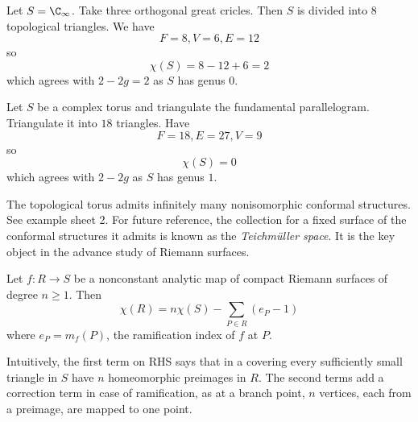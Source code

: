 \documentclass[a4paper]{article}
\begin{document}
\begin{eg}
  Let \(S = \C_\infty\). Take three orthogonal great cricles. Then \(S\) is divided into \(8\) topological triangles. We have
  \[
    F= 8, V = 6, E = 12
  \]
  so
  \[
    \chi(S) = 8 - 12 + 6 = 2
  \]
  which agrees with \(2 - 2g = 2\) as \(S\) has genus \(0\).
\end{eg}

\begin{eg}
  Let \(S\) be a complex torus and triangulate the fundamental parallelogram. Triangulate it into \(18\) triangles. Have
  \[
    F = 18, E = 27, V = 9
  \]
  so
  \[
    \chi(S) = 0
  \]
  which agrees with \(2 - 2g\) as \(S\) has genus \(1\).
\end{eg}

\begin{remark}
  The topological torus admits infinitely many nonisomorphic conformal structures. See example sheet 2. For future reference, the collection for a fixed surface of the conformal structures it admits is known as the \emph{Teichmüller space}. It is the key object in the advance study of Riemann surfaces.
\end{remark}

\begin{theorem}
  Let \(f: R \to S\) be a nonconstant analytic map of compact Riemann surfaces of degree \(n \geq 1\). Then
  \[
    \chi(R) = n \chi(S) - \sum_{P \in R} (e_P - 1)
  \]
  where \(e_P = m_f(P)\), the ramification index of \(f\) at \(P\).
\end{theorem}

Intuitively, the first term on RHS says that in a covering every sufficiently small triangle in \(S\) have \(n\) homeomorphic preimages in \(R\). The second terms add a correction term in case of ramification, as at a branch point, \(n\) vertices, each from a preimage, are mapped to one point.
\end{document}
